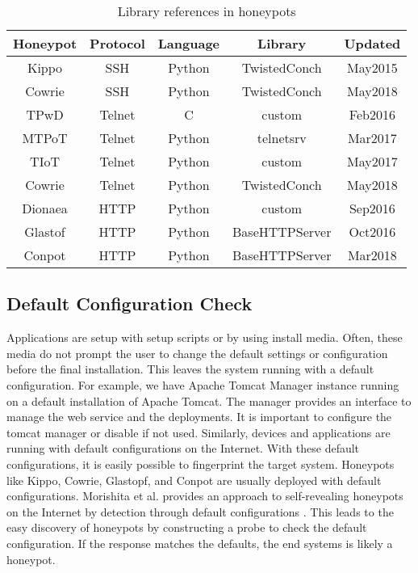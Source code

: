 \begin{table}
\begin{tabular}{||c c c c c||} 
 \hline
 Honeypot & Protocol & Language & Library & Updated \\ [0.5ex] 
 \hline
 Kippo  & SSH    & Python &  TwistedConch & May2015 \\ 
 Cowrie & SSH    & Python &  TwistedConch & May2018 \\
 TPwD   & Telnet & C      &  custom       & Feb2016 \\
 MTPoT  & Telnet & Python &  telnetsrv    & Mar2017 \\
 TIoT   & Telnet & Python &  custom       & May2017 \\
 Cowrie & Telnet & Python &  TwistedConch & May2018 \\
 Dionaea& HTTP   & Python &  custom       & Sep2016 \\
 Glastof& HTTP   & Python &  BaseHTTPServer& Oct2016 \\
 Conpot & HTTP   & Python &  BaseHTTPServer& Mar2018 \\ [1ex] 
 \hline
\end{tabular}
\caption{Library references in honeypots}
\label{library}
\end{table}

\subsection{Default Configuration Check}
Applications are setup with setup scripts or by using install media. Often, these media do not prompt the user to change the default settings or configuration before the final installation. This leaves the system running with a default configuration. For example, we have Apache Tomcat Manager instance running on a default installation of Apache Tomcat. The manager provides an interface to manage the web service and the deployments. It is important to configure the tomcat manager or disable if not used. Similarly, devices and applications are running with default configurations on the Internet. With these default configurations, it is easily possible to fingerprint the target system. Honeypots like Kippo, Cowrie, Glastopf, and Conpot are usually deployed with default configurations. Morishita et al.  provides an approach to self-revealing honeypots on the Internet by detection through default configurations \cite{morishita}.  This leads to the easy discovery of honeypots by constructing a probe to check the default configuration. If the response matches the defaults, the end systems is likely a honeypot.

